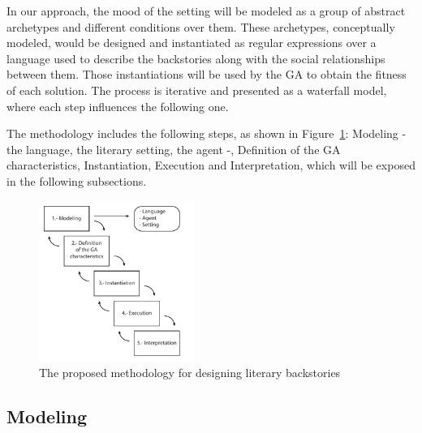 \documentclass{sig-alternate}
\begin{document}
In our approach, the mood of the setting will be modeled as a group of abstract archetypes and different conditions over them. These archetypes, conceptually modeled, would be designed and instantiated as regular expressions over a language used to describe the backstories along with the social relationships between them. Those instantiations will be used by the GA to obtain the fitness of each solution. The process is iterative and presented as a waterfall model, where each step influences the following one.

The methodology includes the following steps, as shown in Figure~\ref{fig:methodology}: Modeling - the language, the literary setting, the agent -, Definition of the GA characteristics, Instantiation, Execution and Interpretation, which will be exposed in the following subsections.


\begin{figure}[htb]
\centering
   \includegraphics[width=12pc] {img/methodology.pdf}
\caption{The proposed methodology for designing literary backstories}
\label{fig:methodology}
\end{figure}


\subsection{Modeling}
\end{document}
